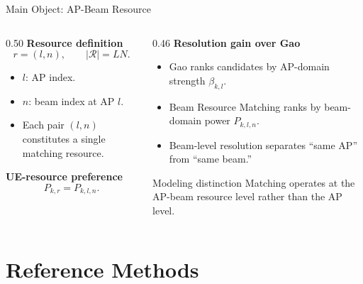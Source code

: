 \documentclass[10pt,aspectratio=169]{beamer}
\newcommand{\BRM}{Beam Resource Matching}
\newenvironment{tightitemize}{%
    \begin{itemize}
        \setlength{\itemsep}{2pt}
        \setlength{\parskip}{0pt}
        \setlength{\parsep}{0pt}
}{%
    \end{itemize}
}
\begin{document}
\begin{frame}{Main Object: AP-Beam Resource}
    \small
    \begin{columns}[T,onlytextwidth]
        \begin{column}{0.50\textwidth}
            \textbf{Resource definition}
            \[
                r=(l,n), \qquad |\mathcal{R}|=LN.
            \]
            \begin{tightitemize}
                \item \(l\): AP index.
                \item \(n\): beam index at AP \(l\).
                \item Each pair \((l,n)\) constitutes a single matching resource.
            \end{tightitemize}

            \vspace{0.5em}
            \textbf{UE-resource preference}
            \[
                P_{k,r}=P_{k,l,n}.
            \]
        \end{column}
        \begin{column}{0.46\textwidth}
            \textbf{Resolution gain over Gao}
            \begin{tightitemize}
                \item Gao ranks candidates by AP-domain strength \(\beta_{k,l}\).
                \item \BRM{} ranks by beam-domain power \(P_{k,l,n}\).
                \item Beam-level resolution separates ``same AP'' from ``same beam.''
            \end{tightitemize}

            \vspace{0.7em}
            \begin{block}{Modeling distinction}
                Matching operates at the AP-beam resource level rather than the AP level.
            \end{block}
        \end{column}
    \end{columns}
\end{frame}

\section{Reference Methods}
\end{document}
